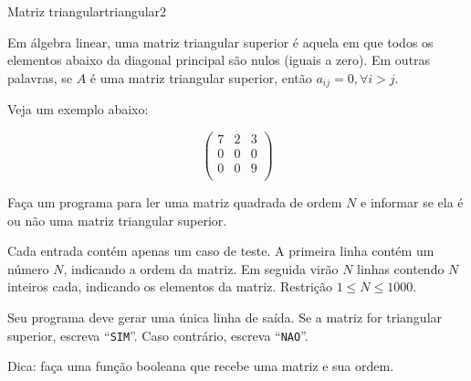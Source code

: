\documentclass[12pt,a4paper,oneside]{article}
\begin{document}
\begin{problem}{Matriz triangular}{triangular}{2}

Em álgebra linear, uma matriz triangular superior é aquela em que todos os elementos abaixo da diagonal principal são nulos (iguais a zero). Em outras palavras, se $A$ é uma matriz triangular superior, então $a_{ij}=0, \forall i>j$.

Veja um exemplo abaixo:

$$
\begin{pmatrix}
7 & 2 & 3\\
0 & 0 & 0\\
0 & 0 & 9\\
\end{pmatrix}
$$

Faça um programa para ler uma matriz quadrada de ordem $N$ e informar se ela é ou não uma matriz triangular superior.

%

\InputFile

Cada entrada contém apenas um caso de teste. A primeira linha contém um número $N$, indicando a ordem da matriz. Em seguida virão $N$ linhas contendo $N$ inteiros cada, indicando os elementos da matriz.  Restrição $1 \leq N \leq 1000$.

\OutputFile

Seu programa deve gerar uma única linha de saída. Se a matriz for triangular superior, escreva ``\texttt{SIM}''. Caso contrário, escreva ``\texttt{NAO}''.


\Example

\begin{example}
%
\end{example}

\begin{example}
%
\end{example}

\begin{example}
%
\end{example}

\vspace{12pt}
Dica: faça uma função booleana que recebe uma matriz e sua ordem.

\end{problem}
\end{document}
